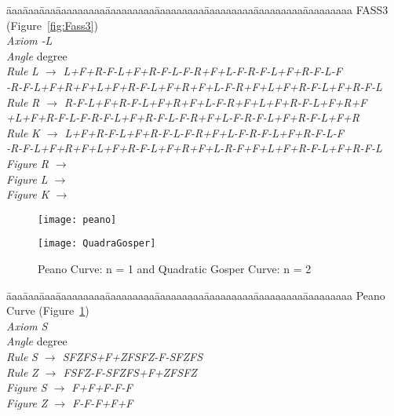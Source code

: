 \begin{tabbing}
\=aaa\=aaa\=aaa\=aaaaaaaaa\=aaaaaaaaa\=aaaaaaaaa\=aaaaaaaaa\=aaaaaaaaa\=aaaaaaaaa\kill
FASS3 (Figure~\ref{fig:Fass3})\\
\>\>\>\> \emph{Axiom} \>\>\emph{-L}\\
\>\>\>\> \emph{Angle} \> degree\\
\>\>\>\> \emph{Rule}  \>\>\emph{L $\rightarrow$ L+F+R-F-L+F+R-F-L-F-R+F+L-F-R-F-L+F+R-F-L-F}\\
\>\>\>\>\>\> \emph{-R-F-L+F+R+F+L+F+R-F-L+F+R+F+L-F-R+F+L+F+R-F-L+F+R-F-L}\\
\>\>\>\> \emph{Rule}  \>\>\emph{R $\rightarrow$ R-F-L+F+R-F-L+F+R+F+L-F-R+F+L+F+R-F-L+F+R+F}\\
\>\>\>\>\>\> \emph{+L+F+R-F-L-F-R-F-L+F+R-F-L-F-R+F+L-F-R-F-L+F+R-F-L+F+R}\\
\>\>\>\> \emph{Rule}  \>\>\emph{K $\rightarrow$ L+F+R-F-L+F+R-F-L-F-R+F+L-F-R-F-L+F+R-F-L-F}\\
\>\>\>\>\>\> \emph{-R-F-L+F+R+F+L+F+R-F-L+F+R+F+L-R-F+F+L+F+R-F-L+F+R-F-L}\\
\>\>\>\> \emph{Figure}  \>\>\emph{R $\rightarrow$ }\\
\>\>\>\> \emph{Figure}  \>\>\emph{L $\rightarrow$ }\\
\>\>\>\> \emph{Figure}  \>\>\emph{K $\rightarrow$ }
\end{tabbing}


\begin{figure}[!htbp]
\begin{minipage}[c]{.5\linewidth}
\centerline{\texttt{[image: peano]}}
\end{minipage}
\begin{minipage}[c]{.5\linewidth}
\centerline{\texttt{[image: QuadraGosper]}}
\end{minipage}
\caption{Peano Curve: n = 1 and Quadratic Gosper Curve: n = 2}
\label{fig:peano}
\end{figure}


\begin{tabbing}
\=aaa\=aaa\=aaa\=aaaaaaaaa\=aaaaaaaaa\=aaaaaaaaa\=aaaaaaaaa\=aaaaaaaaa\=aaaaaaaaa\kill
Peano Curve (Figure~\ref{fig:peano})\\
\>\>\>\> \emph{Axiom} \>\>\emph{S}\\
\>\>\>\> \emph{Angle} \> degree\\
\>\>\>\> \emph{Rule}  \>\>\emph{S $\rightarrow$ SFZFS+F+ZFSFZ-F-SFZFS}\\
\>\>\>\> \emph{Rule}  \>\>\emph{Z $\rightarrow$ FSFZ-F-SFZFS+F+ZFSFZ}\\
\>\>\>\> \emph{Figure}  \>\>\emph{S $\rightarrow$ F+F+F-F-F}\\
\>\>\>\> \emph{Figure}  \>\>\emph{Z $\rightarrow$ F-F-F+F+F}
\end{tabbing}

